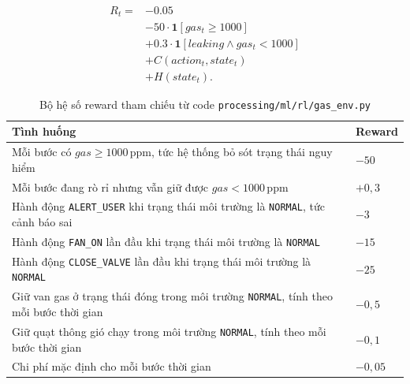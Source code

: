 \begin{align*}
R_t = 
& -0.05 \\
& -50 \cdot \mathbf{1}[gas_t \geq 1000] \\
& +0.3 \cdot \mathbf{1}[leaking \land gas_t < 1000] \\
& + C(action_t, state_t) \\
& + H(state_t).
\end{align*}

\begingroup
\small
\renewcommand{\arraystretch}{1.25}
\setlength{\tabcolsep}{4pt}

\begin{longtable}{
  >{\raggedright\arraybackslash}p{10.2cm}
  >{\centering\arraybackslash}p{2.2cm}
}
\caption{Bộ hệ số reward tham chiếu từ code \texttt{processing/ml/rl/gas\_env.py}}
\label{tab:reward_shape} \\
\toprule
\textbf{Tình huống} 
& \textbf{Reward} \\
\midrule
\endfirsthead

\endhead

\endfoot

\bottomrule
\endlastfoot

Mỗi bước có $gas \geq 1000$\,ppm, tức hệ thống bỏ sót trạng thái nguy hiểm
& $-50$ \\

Mỗi bước đang rò rỉ nhưng vẫn giữ được $gas < 1000$\,ppm
& $+0{,}3$ \\

Hành động \texttt{ALERT\_USER} khi trạng thái môi trường là \texttt{NORMAL}, tức cảnh báo sai
& $-3$ \\

Hành động \texttt{FAN\_ON} lần đầu khi trạng thái môi trường là \texttt{NORMAL}
& $-15$ \\

Hành động \texttt{CLOSE\_VALVE} lần đầu khi trạng thái môi trường là \texttt{NORMAL}
& $-25$ \\

Giữ van gas ở trạng thái đóng trong môi trường \texttt{NORMAL}, tính theo mỗi bước thời gian
& $-0{,}5$ \\

Giữ quạt thông gió chạy trong môi trường \texttt{NORMAL}, tính theo mỗi bước thời gian
& $-0{,}1$ \\

Chi phí mặc định cho mỗi bước thời gian
& $-0{,}05$ \\

\end{longtable}
\endgroup

